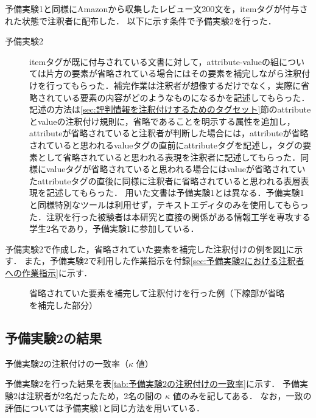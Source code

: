 \documentclass[japanese]{jnlp_1.4}
\begin{document}
予備実験1と同様にAmazonから収集したレビュー文200文を，itemタグが付与された状態で注釈者に配布した．
以下に示す条件で予備実験2を行った．
\begin{description}
\item[予備実験2]
itemタグが既に付与されている文書に対して，attribute-valueの組については片方の要素が省略されている場合にはその要素を補完しながら注釈付けを行ってもらった．補完作業は注釈者が想像するだけでなく，実際に省略されている要素の内容がどのようなものになるかを記述してもらった．記述の方法は\ref{sec:評判情報を注釈付けするためのタグセット}節のattributeとvalueの注釈付け規則に，省略であることを明示する属性を追加し，attributeが省略されていると注釈者が判断した場合には，attributeが省略されていると思われるvalueタグの直前にattributeタグを記述し，タグの要素として省略されていると思われる表現を注釈者に記述してもらった．同様にvalueタグが省略されていると思われる場合にはvalueが省略されていたattributeタグの直後に同様に注釈者に省略されていると思われる表層表現を記述してもらった．
用いた文書は予備実験1とは異なる．予備実験1と同様特別なツールは利用せず，テキストエディタのみを使用してもらった．注釈を行った被験者は本研究と直接の関係がある情報工学を専攻する学生2名であり，予備実験1に参加している．
\end{description}
予備実験2で作成した，省略されていた要素を補完した注釈付けの例を図\ref{fig:省略されていた要素を補完して注釈付けを行った例}に示す．
また，予備実験2で利用した作業指示を付録\ref{sec:予備実験2における注釈者への作業指示}に示す．

\begin{figure}[b]
\vspace{-1\baselineskip}

\caption{省略されていた要素を補完して注釈付けを行った例（下線部が省略を補完した部分）}
\label{fig:省略されていた要素を補完して注釈付けを行った例}
\end{figure}


\subsection{予備実験2の結果}
\label{sec:予備実験2の結果}

\begin{table}[b]
\caption{予備実験2の注釈付けの一致率（$\kappa$ 値）}
\label{tab:予備実験2の注釈付けの一致率}

\end{table}

予備実験2を行った結果を表\ref{tab:予備実験2の注釈付けの一致率}に示す．
予備実験2は注釈者が2名だったため，2名の間の $\kappa$ 値のみを記してある．
なお，一致の評価については予備実験1と同じ方法を用いている．
\end{document}
